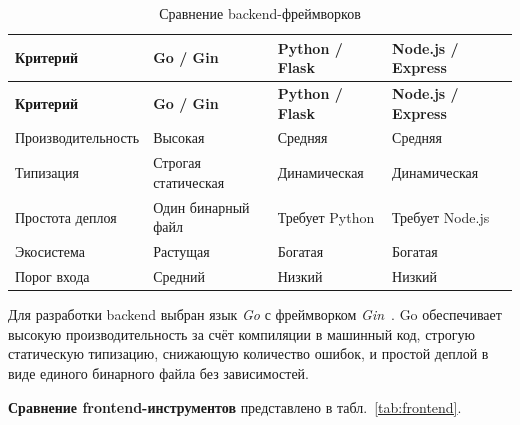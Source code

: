 \begin{longtable}{|p{4.5cm}|p{3.2cm}|p{3.2cm}|p{3.2cm}|}
	\caption{Сравнение backend-фреймворков}
	\label{tab:backend} \\

	\hline
	\textbf{Критерий} & \textbf{Go / Gin} & \textbf{Python / Flask} & \textbf{Node.js / Express} \\ \hline
	\endfirsthead

	\tabcont{\ref{tab:backend}}
	\textbf{Критерий} & \textbf{Go / Gin} & \textbf{Python / Flask} & \textbf{Node.js / Express} \\ \hline
	\endhead

	\hline
	\endfoot

	\hline
	\endlastfoot

	Производительность & Высокая           & Средняя                 & Средняя                    \\ \hline
	Типизация          & Строгая статическая & Динамическая           & Динамическая               \\ \hline
	Простота деплоя    & Один бинарный файл & Требует Python         & Требует Node.js            \\ \hline
	Экосистема         & Растущая          & Богатая                 & Богатая                    \\ \hline
	Порог входа        & Средний           & Низкий                  & Низкий                     \\ \hline
\end{longtable}

Для разработки backend выбран язык \textit{Go} с фреймворком
\textit{Gin}~\cite{gin_docs}. Go обеспечивает высокую производительность
за счёт компиляции в машинный код, строгую статическую типизацию, снижающую
количество ошибок, и простой деплой в виде единого бинарного файла без
зависимостей.

\textbf{Сравнение frontend-инструментов} представлено в табл.~\ref{tab:frontend}.

